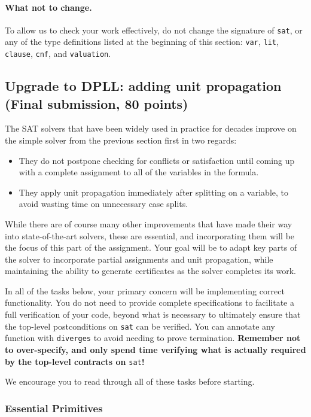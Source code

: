 \documentclass[11pt]{article}
\begin{document}
\paragraph{What not to change.} To allow us to check your work effectively, do not change the signature of \verb'sat', or any of the type definitions listed at the beginning of this section: \verb'var', \verb'lit', \verb'clause', \verb'cnf', and \verb'valuation'.

\subsection{Upgrade to DPLL: adding unit propagation (Final submission, 80 points)}

The SAT solvers that have been widely used in practice for decades improve on the simple solver from the previous section first in two regards: 
\begin{itemize}
\item They do not postpone checking for conflicts or satisfaction until coming up with a complete assignment to all of the variables in the formula.
\item They apply unit propagation immediately after splitting on a variable, to avoid wasting time on unnecessary case splits.
\end{itemize}
While there are of course many other improvements that have made their way into state-of-the-art solvers, these are essential, and incorporating them will be the focus of this part of the assignment.
Your goal will be to adapt key parts of the solver to incorporate partial assignments and unit propagation, while maintaining the ability to generate certificates as the solver completes its work.

In all of the tasks below, your primary concern will be implementing correct functionality.
You do not need to provide complete specifications to facilitate a full verification of your code, beyond what is necessary to ultimately ensure that the top-level postconditions on \verb'sat' can be verified.
You can annotate any function with \verb'diverges' to avoid needing to prove termination.
\textbf{Remember not to over-specify, and only spend time verifying what is actually required by the top-level contracts on} \verb|sat|\textbf{!}

We encourage you to read through all of these tasks before starting.

\subsubsection*{Essential Primitives}
\end{document}
